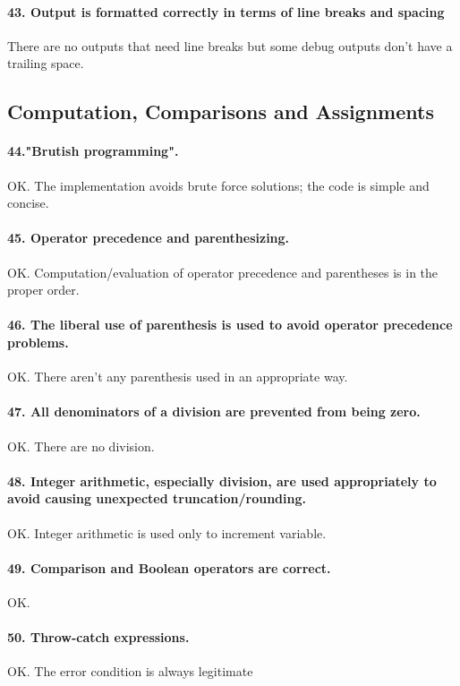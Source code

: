 \documentclass[english]{article}
\begin{document}
{{\paragraph{43. Output is formatted correctly in terms of line breaks and spacing}
There are no outputs that need line breaks but some debug outputs don't have a trailing space.

\subsection{Computation, Comparisons and Assignments}
\paragraph{44."Brutish programming".}
OK. The implementation avoids brute force solutions; the code is simple and concise.

\paragraph{45. Operator precedence and parenthesizing.}
OK. Computation/evaluation of operator precedence and parentheses is in the proper order.
 
\paragraph{46. The liberal use of parenthesis is used to avoid operator precedence problems.}
OK. There aren't any parenthesis used in an appropriate way.

\paragraph{47. All denominators of a division are prevented from being zero.}
OK. There are no division.

\paragraph{48. Integer arithmetic, especially division, are used appropriately to avoid causing unexpected truncation/rounding.}
OK. Integer arithmetic is used only to increment variable.

\paragraph{49. Comparison and Boolean operators are correct.}
OK.

\paragraph{50. Throw-catch expressions.}
OK. The error condition is always legitimate

}}
\end{document}
